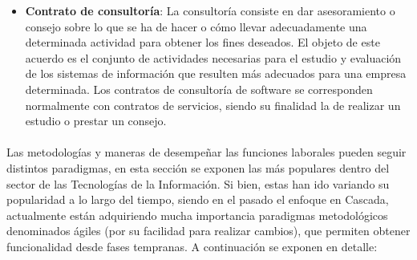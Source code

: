 \documentclass[12pt, a4paper]{report}
\begin{document}
\begin{itemize}
            	\item \textbf{Contrato de consultoría}: La consultoría consiste en dar asesoramiento o consejo sobre lo que se ha de hacer o cómo llevar adecuadamente una determinada actividad para obtener los fines deseados. El objeto de este acuerdo es el conjunto de actividades necesarias para el estudio y evaluación de los sistemas de información que resulten más adecuados para una empresa determinada. Los contratos de consultoría de software se corresponden normalmente con contratos de servicios, siendo su finalidad la de realizar un estudio o prestar un consejo. 

            \end{itemize}
            
            \paragraph{}
			Las metodologías y maneras de desempeñar las funciones laborales pueden seguir distintos paradigmas, en esta sección se exponen las más populares dentro del sector de las Tecnologías de la Información. Si bien, estas han ido variando su popularidad a lo largo del tiempo, siendo en el pasado el enfoque en Cascada, actualmente están adquiriendo mucha importancia paradigmas metodológicos denominados ágiles (por su facilidad para realizar cambios), que permiten obtener funcionalidad desde fases tempranas. A continuación se exponen en detalle:
            
\end{document}
